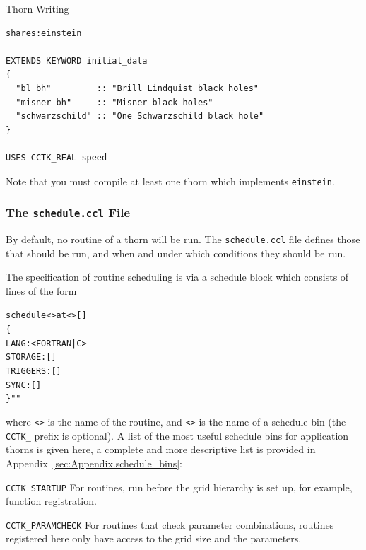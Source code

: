 \begin{cactuspart}{Thorn Writing}
\begin{verbatim}
shares:einstein

EXTENDS KEYWORD initial_data
{
  "bl_bh"         :: "Brill Lindquist black holes"
  "misner_bh"     :: "Misner black holes"
  "schwarzschild" :: "One Schwarzschild black hole"
}

USES CCTK_REAL speed

\end{verbatim}

Note that you must compile at least one thorn which implements \texttt{einstein}.



\subsubsection{The \texttt{schedule.ccl} File}
\label{subsec:schedule_ccl}
By default, no routine of a thorn will be run.  The \texttt{schedule.ccl}
file defines those that should be run, and when and under which
conditions they should be run.

The specification of routine scheduling is via a schedule block which
consists of lines of the form

\begin{alltt}
schedule <> at <> []
\{
  LANG:     <FORTRAN|C>
  STORAGE:  []
  TRIGGERS: []
  SYNC:     []
\} ""
\end{alltt}
where \texttt{<>} is the name of the routine, and
\texttt{<>} is the name of a schedule bin (the \texttt{CCTK\_}
prefix is optional). A list of the most useful schedule bins for application
thorns is given here, a complete and more descriptive list is provided in
Appendix~\ref{sec:Appendix.schedule_bins}:

\begin{Lentry}

\item [\texttt{CCTK\_STARTUP}]
For routines, run before the grid hierarchy is set up, for example, function
registration.

\item [\texttt{CCTK\_PARAMCHECK}]
For routines that check parameter combinations, routines registered here
only have access to the grid size and the parameters.


\end{Lentry}
\end{cactuspart}
